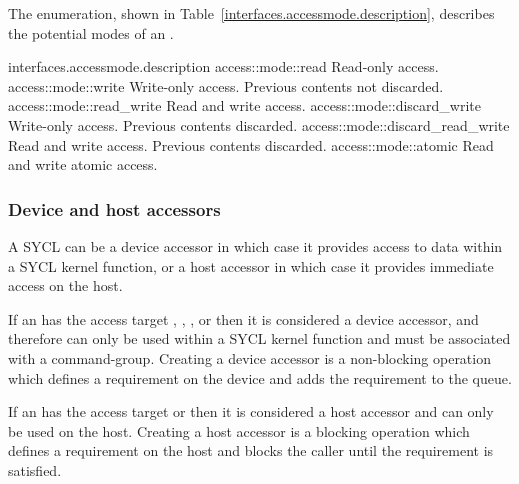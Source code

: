 The  enumeration, shown in Table~\ref{interfaces.accessmode.description}, describes the potential modes of an .


{interfaces.accessmode.description}
 \addRow
    {access::mode::read}
    {%
      Read-only access.
    }
  \addRow
    {access::mode::write}
    {%
     Write-only access.
     Previous contents not discarded.
    }
  \addRow
    {access::mode::read_write}
    {%
      Read and write access.
    }
  \addRow
    {access::mode::discard_write}
    {%
      Write-only access.
      Previous contents discarded.
    }
  \addRow
    {access::mode::discard_read_write}
    {%
      Read and write access.
      Previous contents discarded.
    }
  \addRow
    {access::mode::atomic}
    {%
      Read and write atomic access.
    }
\completeTable


\subsubsection{Device and host accessors}

A SYCL  can be a device accessor in which case it provides
access to data within a SYCL kernel function, or a host accessor in which case
it provides immediate access on the host.

If an  has the access target , ,
,  or
 then it is considered a device
accessor, and therefore can only be used within a SYCL kernel function and must
be associated with a \gls{command-group}. Creating a device accessor is a
non-blocking operation which defines a requirement on the device and adds the
requirement to the queue.

If an  has the access target  or  then it
is considered a host accessor and can only be used on the \gls{host}. Creating a
host accessor is a blocking operation which defines a requirement on the host
and blocks the caller until the requirement is satisfied.

